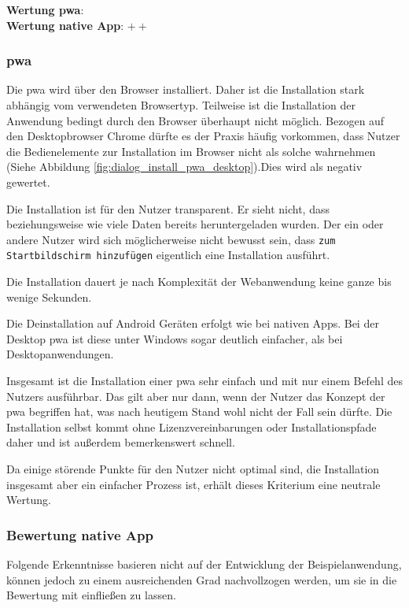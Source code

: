 \textbf{Wertung \ac{pwa}}: \Circle \\
\textbf{Wertung native App}: $++$ \\

\subsubsection{\ac{pwa}}
Die \ac{pwa} wird über den Browser installiert. Daher ist die Installation stark abhängig vom verwendeten Browsertyp. Teilweise ist die Installation der Anwendung bedingt durch den Browser überhaupt nicht möglich. Bezogen auf den Desktopbrowser Chrome dürfte es der Praxis häufig vorkommen, dass Nutzer die Bedienelemente zur Installation im Browser nicht als solche wahrnehmen (Siehe Abbildung \ref{fig:dialog_install_pwa_desktop}).Dies wird als negativ gewertet.

Die Installation ist für den Nutzer transparent. Er sieht nicht, dass beziehungsweise wie viele Daten bereits heruntergeladen wurden. Der ein oder andere Nutzer wird sich möglicherweise nicht bewusst sein, dass \texttt{zum Startbildschirm hinzufügen} eigentlich eine Installation ausführt.

Die Installation dauert je nach Komplexität der Webanwendung keine ganze bis wenige Sekunden.

Die Deinstallation auf Android Geräten erfolgt wie bei nativen Apps. Bei der Desktop \ac{pwa} ist diese unter Windows sogar deutlich einfacher, als bei Desktopanwendungen.

Insgesamt ist die Installation einer \ac{pwa} sehr einfach und mit nur einem Befehl des Nutzers ausführbar. Das gilt aber nur dann, wenn der Nutzer das Konzept der \ac{pwa} begriffen hat, was nach heutigem Stand wohl nicht der Fall sein dürfte. Die Installation selbst kommt ohne Lizenzvereinbarungen oder Installationspfade daher und ist außerdem bemerkenswert schnell.

Da einige störende Punkte für den Nutzer nicht optimal sind, die Installation insgesamt aber ein einfacher Prozess ist, erhält dieses Kriterium eine neutrale Wertung.


\subsubsection{Bewertung native App}
Folgende Erkenntnisse basieren nicht auf der Entwicklung der Beispielanwendung, können jedoch zu einem ausreichenden Grad nachvollzogen werden, um sie in die Bewertung mit einfließen zu lassen.

